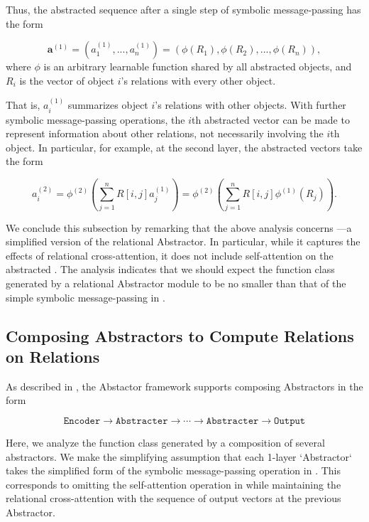 Thus, the abstracted sequence after a single step of symbolic message-passing has the form

\begin{equation}
	\label{eq:abstracted_seq_1_layer_abstracter}
	\boldsymbol{a}^{(1)} = (a_1^{(1)}, ..., a_n^{(1)}) = \left(\phi(R_1), \phi(R_2), ..., \phi(R_n)\right),
\end{equation}
\noindent where $\phi$ is an arbitrary learnable function shared by all abstracted objects, and $R_i$ is the vector of object $i$'s relations with every other object. 

That is, $a_i^{(1)}$ summarizes object $i$'s relations with other objects. With further symbolic message-passing operations, the $i$th abstracted vector can be made to represent information about other relations, not necessarily involving the $i$th object. In particular, for example, at the second layer, the abstracted vectors take the form

\begin{equation}
	a_i^{(2)} = \phi^{(2)} \left( \sum_{j=1}^{n} R[i,j] a_j^{(1)} \right) = \phi^{(2)} \left( \sum_{j=1}^{n} R[i,j] \phi^{(1)}(R_j) \right).
\end{equation}

We conclude this subsection by remarking that the above analysis concerns ---a simplified version of the relational Abstractor. In particular, while it captures the effects of relational cross-attention, it does not include self-attention on the abstracted . The analysis indicates that we should expect the function class generated by a relational Abstractor module  to be no smaller than that of the simple symbolic message-passing in .


\subsection{Composing Abstractors to Compute Relations on Relations}
\label{ssec:compsing_abstracters}

As described in , the Abstactor framework supports composing Abstractors in the form 

\begin{equation*}
	\texttt{Encoder} \to \texttt{Abstracter} \to \cdots \to \texttt{Abstracter} \to \texttt{Output}    
\end{equation*}

Here, we analyze the function class generated by a composition of several abstractors. We make the simplifying assumption that each 1-layer `Abstractor` takes the simplified form of the symbolic message-passing operation in . This corresponds to omitting the self-attention operation in  while maintaining the relational cross-attention with the sequence of output vectors at the previous Abstractor.

